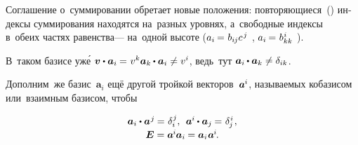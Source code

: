 \begin{otherlanguage}{russian}

{\small\setlength{\abovedisplayskip}{2pt}\setlength{\belowdisplayskip}{2pt}
Соглашение о~суммировании обретает новые положения: повторяющиеся~() индексы суммирования находятся на~\hbox{разных} уровнях, а~свободные индексы в~обеих частях равенства\:--- на~одной высоте (${a_i \hspace{-0.16ex} = \hspace{.1ex} b_{i\hspace{-0.1ex}j} c^{\hspace{.2ex}j}}$\ru{\:---} , ${a_i \hspace{-0.16ex} = \hspace{.1ex} b_{kk}^{\hspace{.1ex}i}}$\ru{\:---} ).
\par}

В~таком базисе уж\'{е} ${\bm{v} \dotp \bm{a}_i \hspace{-0.1ex} = \hspace{.1ex} v^{k} \bm{a}_k \hspace{-0.1ex} \dotp \bm{a}_i \neq\vspace{.2ex} v^{i}}$\hspace{-0.25ex}, ведь~тут ${\bm{a}_i \hspace{-0.1ex} \dotp \bm{a}_k \neq\vspace{.2ex} \delta_{ik}}$.

Дополним~же \hbox{базис}~${\bm{a}_i}$ ещё другой тройкой векторов~\hbox{${\bm{a}^{\hspace{-0.05ex}i}}$\hspace{-0.25ex},} \hbox{называемых} кобазисом или~взаимным базисом, чтобы

\nopagebreak\vspace{-0.3em}\begin{equation}\label{fundamentalpropertyofcobasis}
\begin{array}{c}
\bm{a}_i \dotp \bm{a}^{\hspace{.1ex}j} \hspace{-0.1ex} = \hspace{.1ex} \delta_i^{\hspace{.1ex}j} , \:\:
\bm{a}^{\hspace{-0.05ex}i} \hspace{-0.1ex} \dotp \bm{a}_j \hspace{-0.1ex} = \hspace{.1ex} \delta_{\hspace{-0.1ex}j}^{\hspace{.1ex}i} \hspace{.16ex}, \\[0.2em]
\bm{E} = \bm{a}^{\hspace{-0.1ex}i} \hspace{-0.1ex} \bm{a}_i \hspace{-0.1ex} = \bm{a}_i \hspace{.1ex} \bm{a}^{\hspace{-0.1ex}i}
\hspace{-0.2ex} .
\end{array}
\end{equation}


\end{otherlanguage}
